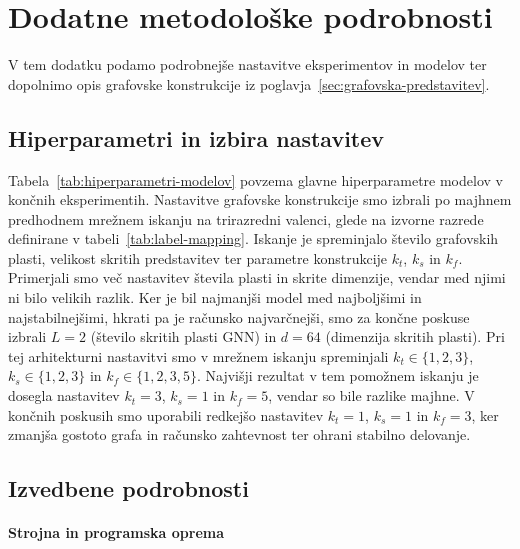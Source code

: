 \chapter{Dodatne metodološke podrobnosti}
\label{app:hiperparametri}
\label{app:grafi}

V tem dodatku podamo podrobnejše nastavitve eksperimentov in modelov ter dopolnimo opis grafovske konstrukcije iz poglavja~\ref{sec:grafovska-predstavitev}.

\section{Hiperparametri in izbira nastavitev}


Tabela~\ref{tab:hiperparametri-modelov} povzema glavne hiperparametre modelov v končnih eksperimentih.
Nastavitve grafovske konstrukcije smo izbrali po majhnem predhodnem mrežnem iskanju na trirazredni valenci, glede na izvorne razrede definirane v tabeli~\ref{tab:label-mapping}.
Iskanje je spreminjalo število grafovskih plasti, velikost skritih predstavitev ter parametre konstrukcije $k_t$, $k_s$ in $k_f$.
Primerjali smo več nastavitev števila plasti in skrite dimenzije, vendar med njimi ni bilo velikih razlik.
Ker je bil najmanjši model med najboljšimi in najstabilnejšimi, hkrati pa je računsko najvarčnejši, smo za končne poskuse izbrali $L=2$ (število skritih plasti GNN) in $d=64$ (dimenzija skritih plasti).
Pri tej arhitekturni nastavitvi smo v mrežnem iskanju spreminjali $k_t \in \{1,2,3\}$, $k_s \in \{1,2,3\}$ in $k_f \in \{1,2,3,5\}$.
Najvišji rezultat v tem pomožnem iskanju je dosegla nastavitev $k_t=3$, $k_s=1$ in $k_f=5$, vendar so bile razlike majhne.
V končnih poskusih smo uporabili redkejšo nastavitev $k_t=1$, $k_s=1$ in $k_f=3$, ker zmanjša gostoto grafa in računsko zahtevnost ter ohrani stabilno delovanje.





\section{Izvedbene podrobnosti}

\subsubsection*{Strojna in programska oprema}
\label{app:strojna-programska-oprema}

